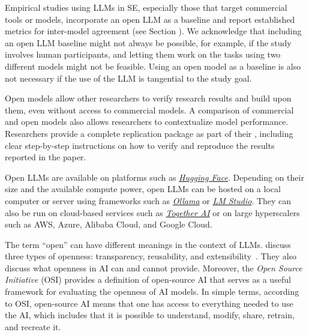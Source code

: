 
Empirical studies using LLMs in SE, especially those that target commercial tools or models, \should incorporate an open LLM as a baseline and report established metrics for inter-model agreement (see Section \benchmarksmetrics).
We acknowledge that including an open LLM baseline might not always be possible, for example, if the study involves human participants, and letting them work on the tasks using two different models might not be feasible.
Using an open model as a baseline is also not necessary if the use of the LLM is tangential to the study goal. %

Open models allow other researchers to verify research results and build upon them, even without access to commercial models.
A comparison of commercial and open models also allows researchers to contextualize model performance.
Researchers \should provide a complete replication package as part of their \supplementarymaterial, including clear step-by-step instructions on how to verify and reproduce the results reported in the paper.

Open LLMs are available on platforms such as \href{https://huggingface.co/}{\emph{Hugging Face}}.
Depending on their size and the available compute power, open LLMs can be hosted on a local computer or server using frameworks such as \href{https://ollama.com/}{\emph{Ollama}} or \href{https://lmstudio.ai/}{\emph{LM Studio}}.
They can also be run on cloud-based services such as \href{https://together.ai/}{\emph{Together AI}} or on large hyperscalers such as AWS, Azure, Alibaba Cloud, and Google Cloud.

The term ``open'' can have different meanings in the context of LLMs.
\citeauthor{widder2024open} discuss three types of openness: transparency, reusability, and extensibility~\cite{widder2024open}.
They also discuss what openness in AI can and cannot provide.
Moreover, the \emph{Open Source Initiative} (OSI) \cite{OSIAI2024} provides a definition of open-source AI that serves as a useful framework for evaluating the openness of AI models.
In simple terms, according to OSI, open-source AI means that one has access to everything needed to use the AI, which includes that it is possible to understand, modify, share, retrain, and recreate it.


